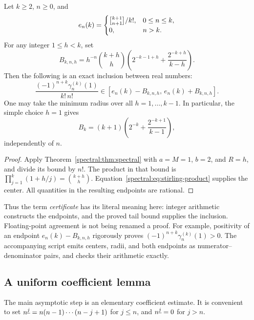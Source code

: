\begin{corollary}\label{spectral:cor:rational}
Let \(k\ge2\), \(n\ge0\), and
\[
e_n(k)=
\begin{cases}
\stirling{k+1}{n+1}/k!,&0\le n\le k,\\
0,&n>k.
\end{cases}
\]
For any integer \(1\le h<k\), set
\begin{equation}\label{spectral:eq:rational-radius}
B_{k,n,h}
=h^{-n}\binom{k+h}{h}
 \left(2^{-k-1+h}+\frac{2^{-k+h}}{k-h}\right).
\end{equation}
Then the following is an exact inclusion between real numbers:
\begin{equation}\label{spectral:eq:rational-inclusion}
\frac{(-1)^{n+k}\gamma_n^{(k)}(1)}{k!\,n!}
\in[e_n(k)-B_{k,n,h},\,e_n(k)+B_{k,n,h}].
\end{equation}
One may take the minimum radius over all \(h=1,\ldots,k-1\).
In particular, the simple choice \(h=1\) gives
\begin{equation}\label{spectral:eq:simple-rational-radius}
B_k=(k+1)\left(2^{-k}+\frac{2^{-k+1}}{k-1}\right),
\end{equation}
independently of \(n\).
\end{corollary}

\begin{proof}
Apply Theorem~\ref{spectral:thm:spectral} with \(a=M=1\), \(b=2\), and
\(R=h\), and divide its bound by \(n!\). The product in that bound is
\(\prod_{j=1}^k(1+h/j)=\binom{k+h}{h}\).
Equation~\eqref{spectral:eq:stirling-product} supplies the center.
All quantities in the resulting endpoints are rational.
\end{proof}

Thus the term \emph{certificate} has its literal meaning here:
integer arithmetic constructs the endpoints, and the proved tail
bound supplies the inclusion. Floating-point agreement is not being
renamed a proof. For example, positivity of an endpoint
\(e_n(k)-B_{k,n,h}\) rigorously proves
\((-1)^{n+k}\gamma_n^{(k)}(1)>0\).
The accompanying script emits centers, radii, and both endpoints
as numerator--denominator pairs, and checks their arithmetic exactly.

\subsection{A uniform coefficient lemma}

The main asymptotic step is an elementary coefficient estimate.
It is convenient to set
\(n^{\underline{j}}=n(n-1)\cdots(n-j+1)\) for \(j\le n\), and
\(n^{\underline{j}}=0\) for \(j>n\).


